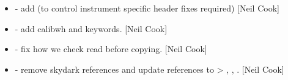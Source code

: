 \documentclass[a4paper,10pt,english]{report}
\begin{document}
\begin{itemize}
\item {} 
 - add  (to control
instrument specific header fixes required) {[}Neil Cook{]}

\item {} 
 - add calibwh and 
keywords. {[}Neil Cook{]}

\item {} 
 - fix how we check read before copying. {[}Neil
Cook{]}

\item {} 
 - remove skydark references
and update references to  \textendash{}\textgreater{} , ,
. {[}Neil Cook{]}

\end{itemize}
\end{document}

